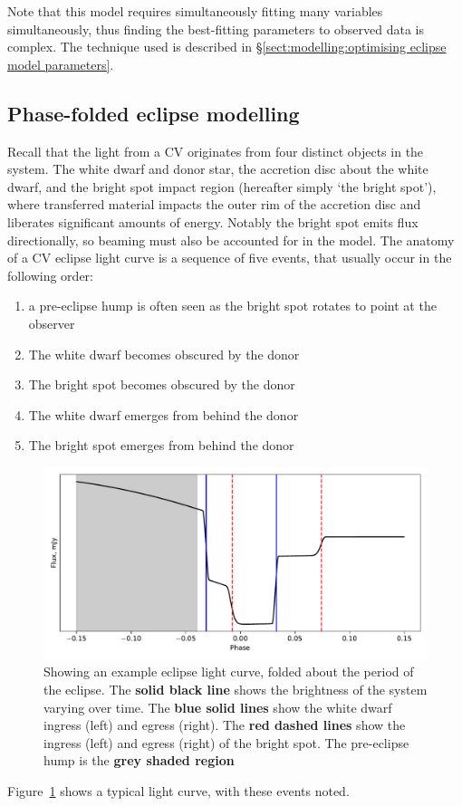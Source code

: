 Note that this model requires simultaneously fitting many variables simultaneously, thus finding the best-fitting parameters to observed data is complex. The technique used is described in \S\ref{sect:modelling:optimising eclipse model parameters}.

\subsection{Phase-folded eclipse modelling}
\label{sect:modelling:eclipse modelling}

Recall that the light from a CV originates from four distinct objects in the system. The white dwarf and donor star, the accretion disc about the white dwarf, and the bright spot impact region (hereafter simply `the bright spot'), where transferred material impacts the outer rim of the accretion disc and liberates significant amounts of energy. Notably the bright spot emits flux directionally, so beaming must also be accounted for in the model.
The anatomy of a CV eclipse light curve is a sequence of five events, that usually occur in the following order:
\begin{enumerate}
    \setlength\itemsep{0em}
    \item a pre-eclipse hump is often seen as the bright spot rotates to point at the observer
    \item The white dwarf becomes obscured by the donor
    \item The bright spot becomes obscured by the donor
    \item The white dwarf emerges from behind the donor
    \item The bright spot emerges from behind the donor
\end{enumerate}
\begin{figure}
    \centering
    \includegraphics[width=\textwidth]{figures/introduction/example_eclipse.pdf}
    \caption{Showing an example eclipse light curve, folded about the period of the eclipse. The {\bf solid black line} shows the brightness of the system varying over time. The {\bf blue solid lines} show the white dwarf ingress (left) and egress (right). The {\bf red dashed lines} show the ingress (left) and egress (right) of the bright spot. The pre-eclipse hump is the {\bf grey shaded region}}
    \label{fig:introduction:example labelled eclipse light curve}
\end{figure}
Figure~\ref{fig:introduction:example labelled eclipse light curve} shows a typical light curve, with these events noted.


